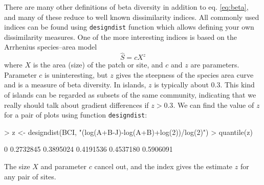 \documentclass[a4paper,10pt]{amsart}
\begin{document}
There are many other definitions of beta diversity in addition to
eq. \ref{eq:beta}, and many of these reduce to well known
dissimilarity indices.  All commonly used indices can be found using
\texttt{designdist} function which allows defining your own
dissimilarity measures. One of the more interesting indices is based
on the Arrhenius species--area model
\begin{equation}
  \label{eq:arrhenius}
  \hat S = c X^z
\end{equation}
where $X$ is the area (size) of the patch or site, and $c$ and $z$ are
parameters. Parameter $c$ is uninteresting, but $z$ gives the
steepness of the species area curve and is a measure of beta
diversity. In islands,  $z$ is typically about $0.3$. This kind of
islands can be regarded as subsets of the same community, indicating
that we really should talk about gradient differences if $z > 0.3$. We
can find the value of $z$ for a pair of plots using function
\texttt{designdist}:
\begin{Schunk}
\begin{Sinput}
> z <- designdist(BCI, "(log(A+B-J)-log(A+B)+log(2))/log(2)")
> quantile(z)
\end{Sinput}
\begin{Soutput}
       0%       25%       50%       75%      100% 
0.2732845 0.3895024 0.4191536 0.4537180 0.5906091 
\end{Soutput}
\end{Schunk}
The size $X$ and parameter $c$ cancel out, and the index gives the
estimate $z$ for any pair of sites.
\end{document}
